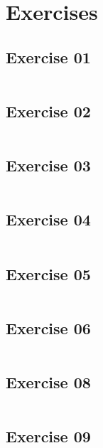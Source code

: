 \documentclass[11pt]{article}
\begin{document}
\clearpage
\newpage
\appendix
\section{Exercises}

\subsection{Exercise 01}
\inputminted[linenos,breaklines,fontsize=\small]{R}{RCode/01_Exercise01.R}

\subsection{Exercise 02}
\inputminted[linenos,breaklines,fontsize=\small]{R}{RCode/02_Exercise02.R}

\subsection{Exercise 03}
\inputminted[linenos,breaklines,fontsize=\small]{R}{RCode/03_Exercise03.R}

\subsection{Exercise 04}
\inputminted[linenos,breaklines,fontsize=\small]{R}{RCode/04_Exercise04.R}

\subsection{Exercise 05}
\inputminted[linenos,breaklines,fontsize=\small]{R}{RCode/05_Exercise05.R}

\subsection{Exercise 06}
\inputminted[linenos,breaklines,fontsize=\small]{R}{RCode/06_Exercise06.R}

\subsection{Exercise 08}
\inputminted[linenos,breaklines,fontsize=\small]{R}{RCode/07_Exercise08.R}

\subsection{Exercise 09}
\inputminted[linenos,breaklines,fontsize=\small]{R}{RCode/09_Exercise09.R}
\end{document}
